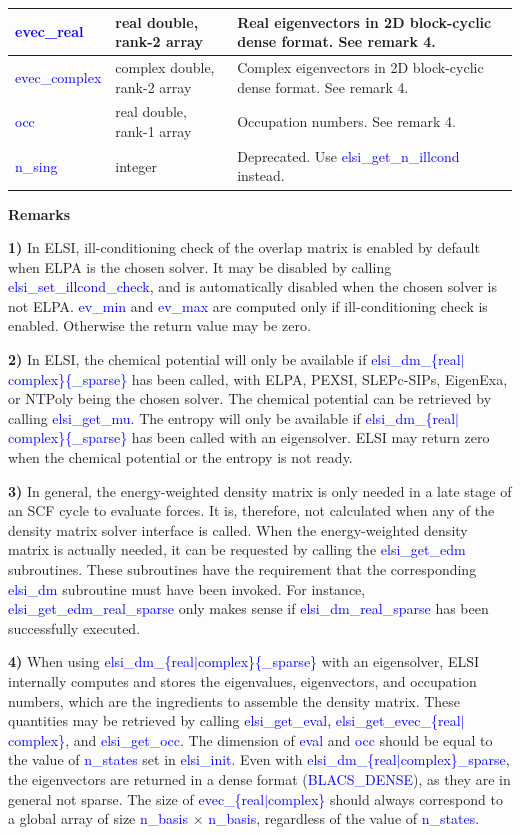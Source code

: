\documentclass{report}
\newcommand{\tcb}[1]{\textcolor{blue}{#1}}
\begin{document}
\begin{tabular}[]{|p{30mm}|p{45mm}|p{90mm}|}
\hline
\tcb{evec\_real}           & real double, rank-2 array    & Real eigenvectors in 2D block-cyclic dense format. See remark 4.\\
\hline
\tcb{evec\_complex}        & complex double, rank-2 array & Complex eigenvectors in 2D block-cyclic dense format. See remark 4.\\
\hline
\tcb{occ}                  & real double, rank-1 array    & Occupation numbers. See remark 4.\\
\hline
\tcb{n\_sing}              & integer                      & Deprecated. Use \tcb{elsi\_get\_n\_illcond} instead.\\
\hline
\end{tabular}

\textbf{Remarks}

\textbf{1)} In ELSI, ill-conditioning check of the overlap matrix is enabled by default when ELPA is the chosen solver. It may be disabled by calling \tcb{elsi\_set\_illcond\_check}, and is automatically disabled when the chosen solver is not ELPA. \tcb{ev\_min} and \tcb{ev\_max} are computed only if ill-conditioning check is enabled. Otherwise the return value may be zero.

\textbf{2)} In ELSI, the chemical potential will only be available if \tcb{elsi\_dm\_\{real$\vert$complex\}\{\_sparse\}} has been called, with ELPA, PEXSI, SLEPc-SIPs, EigenExa, or NTPoly being the chosen solver. The chemical potential can be retrieved by calling \tcb{elsi\_get\_mu}. The entropy will only be available if \tcb{elsi\_dm\_\{real$\vert$complex\}\{\_sparse\}} has been called with an eigensolver. ELSI may return zero when the chemical potential or the entropy is not ready.

\textbf{3)} In general, the energy-weighted density matrix is only needed in a late stage of an SCF cycle to evaluate forces. It is, therefore, not calculated when any of the density matrix solver interface is called. When the energy-weighted density matrix is actually needed, it can be requested by calling the \tcb{elsi\_get\_edm} subroutines. These subroutines have the requirement that the corresponding \tcb{elsi\_dm} subroutine must have been invoked. For instance, \tcb{elsi\_get\_edm\_real\_sparse} only makes sense if \tcb{elsi\_dm\_real\_sparse} has been successfully executed.

\textbf{4)} When using \tcb{elsi\_dm\_\{real$\vert$complex\}\{\_sparse\}} with an eigensolver, ELSI internally computes and stores the eigenvalues, eigenvectors, and occupation numbers, which are the ingredients to assemble the density matrix. These quantities may be retrieved by calling \tcb{elsi\_get\_eval}, \tcb{elsi\_get\_evec\_\{real$\vert$complex\}}, and \tcb{elsi\_get\_occ}. The dimension of \tcb{eval} and \tcb{occ} should be equal to the value of \tcb{n\_states} set in \tcb{elsi\_init}. Even with \tcb{elsi\_dm\_\{real$\vert$complex\}\_sparse}, the eigenvectors are returned in a dense format (\tcb{BLACS\_DENSE}), as they are in general not sparse. The size of \tcb{evec\_\{real$\vert$complex\}} should always correspond to a global array of size \tcb{n\_basis} $\times$ \tcb{n\_basis}, regardless of the value of \tcb{n\_states}.
\end{document}
